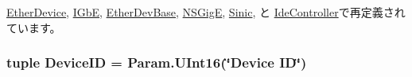 \hyperlink{classEthernet_1_1EtherDevice_a17da7064bc5c518791f0c891eff05fda}{EtherDevice}, \hyperlink{classEthernet_1_1IGbE_a17da7064bc5c518791f0c891eff05fda}{IGbE}, \hyperlink{classEthernet_1_1EtherDevBase_a17da7064bc5c518791f0c891eff05fda}{EtherDevBase}, \hyperlink{classEthernet_1_1NSGigE_a17da7064bc5c518791f0c891eff05fda}{NSGigE}, \hyperlink{classEthernet_1_1Sinic_a17da7064bc5c518791f0c891eff05fda}{Sinic}, と \hyperlink{classIde_1_1IdeController_a17da7064bc5c518791f0c891eff05fda}{IdeController}で再定義されています。\hypertarget{classPci_1_1PciDevice_aa90d1ebfb6ac8c64983451e2196e342f}{
\subsubsection[{DeviceID}]{\setlength{\rightskip}{0pt plus 5cm}tuple {\bf DeviceID} = Param.UInt16(\char`\"{}Device ID\char`\"{})}}
\label{classPci_1_1PciDevice_aa90d1ebfb6ac8c64983451e2196e342f}


